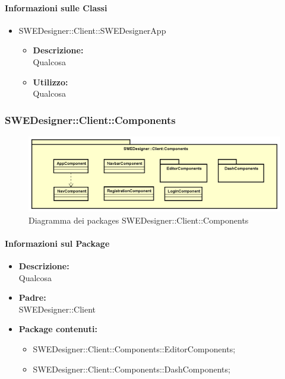 		\paragraph{Informazioni sulle Classi}
		\begin{itemize}
			\item SWEDesigner::Client::SWEDesignerApp
			\begin{itemize}
				\item \textbf{Descrizione: }\\
				Qualcosa
				\item \textbf{Utilizzo: }\\
				Qualcosa
			\end{itemize}
		\end{itemize}


		\subsubsection{SWEDesigner::Client::Components}
		 \begin{figure}[h!]
		\centering
		\includegraphics[scale=0.4]{Disegnetti/SWEDesigner__Client_Components.png}
		\caption{Diagramma dei packages SWEDesigner::Client::Components}
 		\end{figure}
		\paragraph{Informazioni sul Package}
		\begin{itemize}
			\item \textbf{Descrizione: }\\
			Qualcosa
			\item \textbf{Padre: }\\ SWEDesigner::Client
			\item \textbf{Package contenuti: }
			\begin{itemize}
				\item SWEDesigner::Client::Components::EditorComponents;
				\item SWEDesigner::Client::Components::DashComponents;
			\end{itemize}
		\end{itemize}

